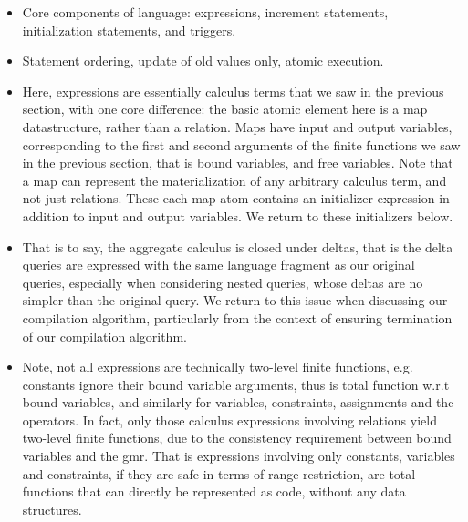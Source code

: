 \begin{itemize}
  \item Core components of language: expressions, increment statements,
  initialization statements, and triggers.
  
  \item Statement ordering, update of old values only, atomic execution.
  
  \item Here, expressions are essentially calculus terms that we saw in the
  previous section, with one core difference: the basic atomic element here is
  a map datastructure, rather than a relation. Maps have input and output
  variables, corresponding to the first and second arguments of the finite
  functions we saw in the previous section, that is bound variables, and free
  variables. Note that a map can represent the materialization of any arbitrary
  calculus term, and not just relations. These each map atom contains an
  initializer expression in addition to input and output variables. We return
  to these initializers below.

  \item That is to say, the aggregate calculus is closed under deltas, that is
  the delta queries are expressed with the same language fragment as our original
  queries, especially when considering nested queries, whose deltas are no
  simpler than the original query. We return to this issue when discussing our
  compilation algorithm, particularly from the context of ensuring termination
  of our compilation algorithm.
  
  
  \item Note, not all expressions are technically two-level finite functions,
  e.g. constants ignore their bound variable arguments, thus is total function
  w.r.t bound variables, and similarly for variables, constraints, assignments
  and the operators. In fact, only those calculus expressions involving
  relations yield two-level finite functions, due to the consistency
  requirement between bound variables and the gmr.
  That is expressions involving only constants, variables and constraints, if
  they are safe in terms of range restriction, are total functions that can
  directly be represented as code, without any data structures.
\end{itemize}

